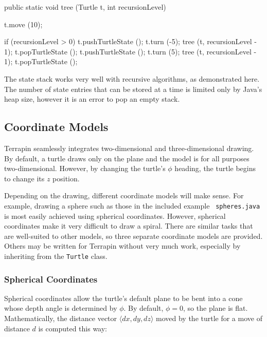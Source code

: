 \documentclass{article}
\begin{document}
      \lstset{gobble=8}
      \begin{java}
	public static void tree (Turtle t, int recursionLevel) {
	  t.move (10);

	  if (recursionLevel > 0) {
	    t.pushTurtleState ();
	    t.turn (-5);
	    tree (t, recursionLevel - 1);
	    t.popTurtleState ();
	    t.pushTurtleState ();
	    t.turn (5);
	    tree (t, recursionLevel - 1);
	    t.popTurtleState ();
	  }
	}
      \end{java}
      
      The state stack works very well with recursive algorithms, as demonstrated
      here. The number of state entries that can be stored at a time is limited
      only by Java's heap size, however it is an error to pop an empty stack.

    \subsection{Coordinate Models}
      \label{sec:coordinate-models}

      Terrapin seamlessly integrates two-dimensional and three-dimensional
      drawing. By default, a turtle draws only on the plane and the model is for
      all purposes two-dimensional. However, by changing the turtle's $\phi$
      heading, the turtle begins to change its $z$ position.

      Depending on the drawing, different coordinate models will make sense. For
      example, drawing a sphere such as those in the included example {\tt
      spheres.java} is most easily achieved using spherical coordinates. However,
      spherical coordinates make it very difficult to draw a spiral. There are
      similar tasks that are well-suited to other models, so three separate
      coordinate models are provided. Others may be written for Terrapin without
      very much work, especially by inheriting from the {\tt Turtle} class.

      \subsubsection{Spherical Coordinates}
	\label{sec:z-spherical}
	\label{sec:spherical-coordinates}

	Spherical coordinates allow the turtle's default plane to be bent into a
	cone whose depth angle is determined by $\phi$. By default, $\phi=0$, so
	the plane is flat. Mathematically, the distance vector $\langle dx, dy,
	dz\rangle$ moved by the turtle for a move of distance $d$ is computed
	this way:
\end{document}
